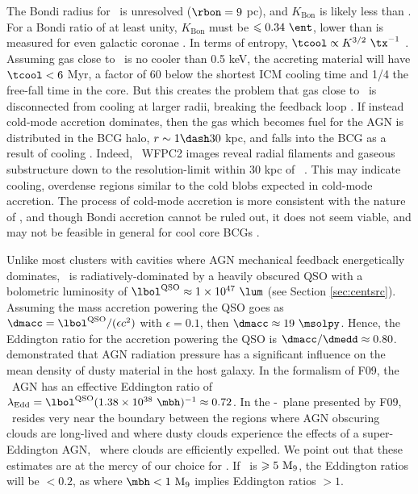 \documentclass[useAMS,usenatbib]{mn2e}
\begin{document}
The Bondi radius for \irs\ is unresolved ($\rbon = 9$ pc), and
$K_{\mathrm{Bon}}$ is likely less than \kna. For a Bondi ratio of at
least unity, $K_{\mathrm{Bon}}$ must be $\le 0.34 ~\ent$, lower than
is measured for even galactic coronae \citep{coronae}. In terms of
entropy, $\tcool \propto K^{3/2} ~\tx^{-1}$ \citep{d06}. Assuming gas
close to \rbon\ is no cooler than 0.5 keV, the accreting material will
have $\tcool < 6$ Myr, a factor of 60 below the shortest ICM cooling
time and 1/4 the free-fall time in the core. But this creates the
problem that gas close to \rbon\ is disconnected from cooling at
larger radii, breaking the feedback loop
\citep{2006NewA...12...38S}. If instead cold-mode accretion dominates,
then the gas which becomes fuel for the AGN is distributed in the BCG
halo, $r \sim 1 \dash 30$ kpc, and falls into the BCG as a result of
cooling \citep{pizzolato05, 2010arXiv1003.4181P}. Indeed, \hst\ WFPC2
images reveal radial filaments and gaseous substructure down to the
resolution-limit within 30 kpc of \irs\ \citep{1999Ap&SS.266..113A}.
This may indicate cooling, overdense regions similar to the cold blobs
expected in cold-mode accretion. The process of cold-mode accretion is
more consistent with the nature of \irs, and though Bondi accretion
cannot be ruled out, it does not seem viable, and may not be feasible
in general for cool core BCGs \citep{minaspin}.

Unlike most clusters with cavities where AGN mechanical feedback
energetically dominates, \irs\ is radiatively-dominated by a heavily
obscured QSO with a bolometric luminosity of $\lqso \approx 1 \times
10^{47} ~\lum$ (see Section \ref{sec:centsrc}). Assuming the mass
accretion powering the QSO goes as $\dmacc = \lqso/(\epsilon c^2)$
with $\epsilon = 0.1$, then $\dmacc \approx 19 ~\msolpy$. Hence, the
Eddington ratio for the accretion powering the QSO is $\dmacc/\dmedd
\approx 0.80$. \citet[][hereafter F09]{2009MNRAS.394L..89F}
demonstrated that AGN radiation pressure has a significant influence
on the mean density of dusty material in the host galaxy. In the
formalism of F09, the \irs\ AGN has an effective Eddington ratio of
$\leff = \lqso (1.38 \times 10^{38} ~\mbh)^{-1} \approx 0.72$. In the
\nhi-\leff\ plane presented by F09, \irs\ resides very near the
boundary between the regions where AGN obscuring clouds are long-lived
and where dusty clouds experience the effects of a super-Eddington
AGN, \ie\ where clouds are efficiently expelled. We point out that
these estimates are at the mercy of our choice for \mbh. If \mbh\ is
$\geqslant 5 ~\mathrm{M}_9$, the Eddington ratios will be $< 0.2$, as where $\mbh
< 1 ~\mnine$ implies Eddington ratios $> 1$.
\end{document}
